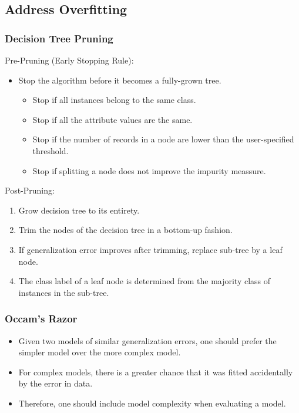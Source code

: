 \subsection{Address Overfitting}
\subsubsection{Decision Tree Pruning}
Pre-Pruning (Early Stopping Rule):
\begin{itemize}
    \item Stop the algorithm before it becomes a fully-grown tree.
    \begin{itemize}
        \item Stop if all instances belong to the same class.
        \item Stop if all the attribute values are the same.
        \item Stop if the number of records in a node are lower than the user-specified threshold.
        \item Stop if splitting a node does not improve the impurity meassure.
    \end{itemize}
\end{itemize}

Post-Pruning:
\begin{enumerate}
    \item Grow decision tree to its entirety.
    \item Trim the nodes of the decision tree in a bottom-up fashion.
    \item If generalization error improves after trimming, replace sub-tree by a leaf node.
    \item The class label of a leaf node is determined from the majority class of instances in the sub-tree.
\end{enumerate}

\subsubsection{Occam's Razor}
\begin{itemize}
    \item Given two models of similar generalization errors, one should prefer the simpler model over the more complex model.
    \item For complex models, there is a greater chance that it was fitted accidentally by the error in data.
    \item Therefore, one should include model complexity when evaluating a model.
\end{itemize}

